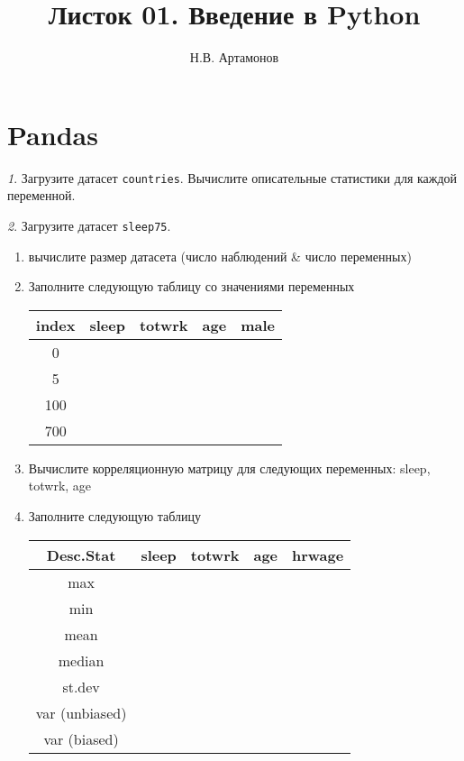 \documentclass[12pt]{article}
\title{Листок 01. Введение в Python}
\author{Н.В. Артамонов}
\theoremstyle{remark}
\newtheorem{exercise}{}[section]
\begin{document}
\maketitle

\tableofcontents

\section{Pandas}

\begin{exercise}
Загрузите датасет \texttt{countries}. Вычислите описательные статистики 
для каждой переменной.
\end{exercise}

\begin{exercise}
Загрузите датасет \texttt{sleep75}.
\begin{enumerate}
	\item вычислите размер датасета (число наблюдений \& число переменных)
	\item Заполните следующую таблицу со значениями переменных
	\begin{center}
		\begin{tabular}{|c|c|c|c|c|} \hline
			index & sleep & totwrk & age & male\\ \hline\hline
			0 & & & & \\ \hline
			5 & & & & \\ \hline
			100 & & & & \\ \hline
			700 & & & & \\ \hline
		\end{tabular}
	\end{center}
	\item Вычислите корреляционную матрицу для следующих переменных: sleep, totwrk, age 
	\item Заполните следующую таблицу
	\begin{center}
		\begin{tabular}{|c|c|c|c|c|} \hline
			Desc.Stat & sleep & totwrk & age & hrwage\\ \hline\hline
			max & & & & \\ \hline
			min & & & & \\ \hline
			mean & & & & \\ \hline
			median & & & & \\ \hline
			st.dev & & & & \\ \hline
			var (unbiased) & & & & \\ \hline
			var (biased) & & & & \\ \hline

\end{tabular}
\end{center}
\end{enumerate}
\end{exercise}
\end{document}
